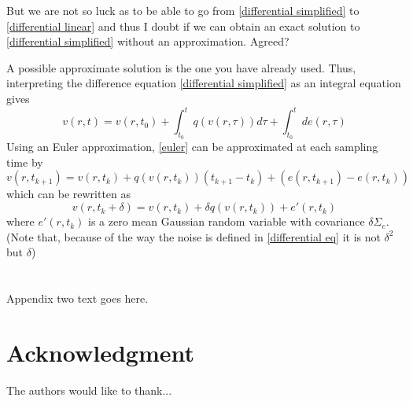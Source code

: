 \documentclass[onecolumn,draftcls]{IEEEtran}
\begin{document}
But we are not so luck as to be able to go from \ref{differential simplified} to \ref{differential linear} and thus I doubt if we can obtain an exact solution to \ref{differential simplified} without an approximation. Agreed?

A possible approximate solution is the one you have already used. Thus, interpreting the difference equation \ref{differential simplified} as an integral equation gives
\begin{equation}\label{euler}
	v\left(r,t\right) =  v(r,t_0) + \int_{t_0}^{t} q\left(v(r,\tau) \right) d\tau  + \int_{t_0}^{t} d e\left(r,\tau\right)
\end{equation}
Using an Euler approximation, \ref{euler} can be approximated at each sampling time by
\begin{equation}\label{euler approx 1}
	v\left(r,t_{k+1} \right) =  v(r,t_k) + q\left(v(r,t_k)\right) (t_{k+1} - t_k) + (e(r,t_{k+1}) - e(r,t_k))
\end{equation}
which can be rewritten as
\begin{equation}\label{euler approx 2}
	v\left(r,t_k + \delta \right) =  v(r,t_k) + \delta q\left(v(r,t_k)\right) + e'(r,t_k)
\end{equation}
where $e'(r,t_k)$ is a zero mean Gaussian random variable with covariance $\delta\Sigma_e$. (Note that, because of the way the noise is defined in \ref{differential eq} it is not $\delta^2$ but $\delta$)

\section{}
Appendix two text goes here.

\section*{Acknowledgment}
The authors would like to thank...

\ifCLASSOPTIONcaptionsoff
  \newpage
\fi








%
\end{document}

